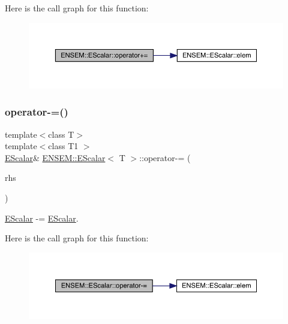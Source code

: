 Here is the call graph for this function\+:
\nopagebreak
\begin{figure}[H]
\begin{center}
\leavevmode
\includegraphics[width=350pt]{d0/d82/classENSEM_1_1EScalar_aa34f8bd686adb144a6d0e5e8f69787ce_cgraph}
\end{center}
\end{figure}
\mbox{\label{classENSEM_1_1EScalar_a2ed33688ab765d0e4d15b391b3f61f33}} 
\subsubsection{\texorpdfstring{operator-\/=()}{operator-=()}\hspace{0.1cm}{\footnotesize\ttfamily [1/2]}}
{\footnotesize\ttfamily template$<$class T$>$ \\
template$<$class T1 $>$ \\
\mbox{\hyperlink{classENSEM_1_1EScalar}{E\+Scalar}}\& \mbox{\hyperlink{classENSEM_1_1EScalar}{E\+N\+S\+E\+M\+::\+E\+Scalar}}$<$ T $>$\+::operator-\/= (\begin{DoxyParamCaption}\item[{const \mbox{\hyperlink{classENSEM_1_1EScalar}{E\+Scalar}}$<$ T1 $>$ \&}]{rhs }\end{DoxyParamCaption})\hspace{0.3cm}{\ttfamily [inline]}}



\mbox{\hyperlink{classENSEM_1_1EScalar}{E\+Scalar}} -\/= \mbox{\hyperlink{classENSEM_1_1EScalar}{E\+Scalar}}. 

Here is the call graph for this function\+:
\nopagebreak
\begin{figure}[H]
\begin{center}
\leavevmode
\includegraphics[width=350pt]{d0/d82/classENSEM_1_1EScalar_a2ed33688ab765d0e4d15b391b3f61f33_cgraph}
\end{center}
\end{figure}
\mbox{\label{classENSEM_1_1EScalar_a2ed33688ab765d0e4d15b391b3f61f33}} 
